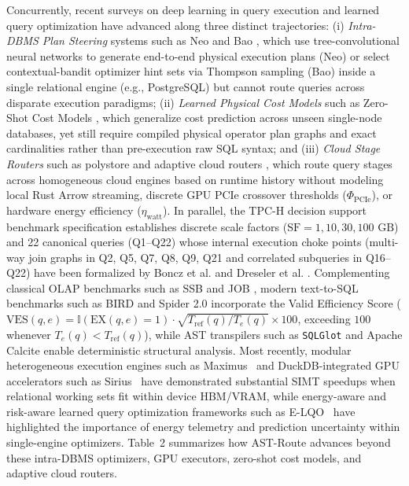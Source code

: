 \documentclass[10pt,a4paper]{article}
\begin{document}
Concurrently, recent surveys on deep learning in query execution \cite{milicevic2024dlquery} and learned query optimization have advanced along three distinct trajectories: (i) \emph{Intra-DBMS Plan Steering} systems such as Neo \cite{marcus2019neo} and Bao \cite{marcus2021bao}, which use tree-convolutional neural networks to generate end-to-end physical execution plans (Neo) or select contextual-bandit optimizer hint sets via Thompson sampling (Bao) inside a single relational engine (e.g., PostgreSQL) but cannot route queries across disparate execution paradigms; (ii) \emph{Learned Physical Cost Models} such as Zero-Shot Cost Models \cite{hilprecht2022zeroshot}, which generalize cost prediction across unseen single-node databases, yet still require compiled physical operator plan graphs and exact cardinalities rather than pre-execution raw SQL syntax; and (iii) \emph{Cloud Stage Routers} such as polystore and adaptive cloud routers \cite{tan2023stage, gupta2023adaptive}, which route query stages across homogeneous cloud engines based on runtime history without modeling local Rust Arrow streaming, discrete GPU PCIe crossover thresholds ($\Phi_{\text{PCIe}}$), or hardware energy efficiency ($\eta_{\text{watt}}$). In parallel, the TPC-H decision support benchmark specification \cite{tpc2022tpch} establishes discrete scale factors ($\text{SF}=1, 10, 30, 100\text{ GB}$) and 22 canonical queries (Q1--Q22) whose internal execution choke points (multi-way join graphs in Q2, Q5, Q7, Q8, Q9, Q21 and correlated subqueries in Q16--Q22) have been formalized by Boncz et al. \cite{boncz2014tpch} and Dreseler et al. \cite{dreseler2020quantifying}. Complementing classical OLAP benchmarks such as SSB \cite{oneil2009ssb} and JOB \cite{leis2015job}, modern text-to-SQL benchmarks such as BIRD \cite{li2023bird} and Spider 2.0 \cite{lei2025spider2} incorporate the Valid Efficiency Score ($\text{VES}(q,e) = \mathbb{I}(\text{EX}(q,e)=1)\cdot\sqrt{T_{\text{ref}}(q)/T_e(q)}\times 100$, exceeding $100$ whenever $T_e(q) < T_{\text{ref}}(q)$), while AST transpilers such as \texttt{SQLGlot} \cite{mao2024sqlglot} and Apache Calcite \cite{begoli2018calcite} enable deterministic structural analysis. Most recently, modular heterogeneous execution engines such as Maximus~\cite{kabic2025maximus} and DuckDB-integrated GPU accelerators such as Sirius~\cite{yogatama2025sirius} have demonstrated substantial SIMT speedups when relational working sets fit within device HBM/VRAM, while energy-aware and risk-aware learned query optimization frameworks such as E-LQO~\cite{liang2026elqo} have highlighted the importance of energy telemetry and prediction uncertainty within single-engine optimizers. Table~2 summarizes how AST-Route advances beyond these intra-DBMS optimizers, GPU executors, zero-shot cost models, and adaptive cloud routers.
\end{document}
